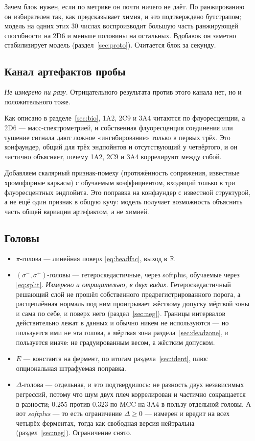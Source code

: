 Зачем блок нужен, если по метрике он почти ничего не даёт. По ранжированию он избирателен так, как
предсказывает химия, и это подтверждено бутстрапом; модель на одних этих 30 числах воспроизводит большую
часть ранжирующей способности на 2D6 и меньше половины на остальных. Вдобавок он заметно стабилизирует
модель (раздел~\ref{sec:proto}). Считается блок за секунду.

\subsection{Канал артефактов пробы}
\label{sec:artifact}

\emph{Не измерено ни разу.} Отрицательного результата против этого канала нет, но и положительного тоже.

Как описано в разделе~\ref{sec:bio}, 1A2, 2C9 и 3A4 читаются по флуоресценции, а 2D6 ---
масс-спектрометрией, и собственная флуоресценция соединения или тушение сигнала дают ложное
«ингибирование» только в первых трёх. Это конфаундер, общий для трёх эндпойнтов и отсутствующий
у четвёртого, и он частично объясняет, почему 1A2, 2C9 и 3A4 коррелируют между собой.

Добавляем скалярный признак-помеху (протяжённость сопряжения, известные хромофорные каркасы) с обучаемым
коэффициентом, входящий только в три флуоресцентных эндпойнта. Это поправка на конфаундер с известной структурой, а не ещё один признак в общую кучу: модель получает
возможность объяснить часть общей вариации артефактом, а не химией.

\subsection{Головы}

\begin{itemize}
\item $\pi$-голова --- линейная поверх \eqref{eq:headfac}, выход в $\mathbb{R}$.
\item $(\sigma^-, \sigma^+)$-головы --- гетероскедастичные, через softplus, обучаемые через
\eqref{eq:split}. \emph{Измерено и отрицательно, в двух видах.} Гетероскедастичный решающий слой не
прошёл собственного предрегистрированного порога, а расщеплённая нормаль под ним проигрывает жёсткому
допуску мёртвой зоны и сама по себе, и поверх него (раздел~\ref{sec:neg}). Границы интервалов
действительно лежат в данных и обычно никем не используются --- но пользуется ими не эта голова, а
мёртвая зона раздела~\ref{sec:deadzone}, и пользуется иначе: не градуированным весом, а жёстким
допуском.
\item $E$ --- константа на фермент, по итогам раздела~\ref{sec:ident}, плюс опциональная штрафуемая поправка.
\item $\Delta$-голова --- отдельная, и это подтвердилось: не разность двух независимых регрессий,
потому что шум двух плеч коррелирован и частично сокращается в разности; 0.255 против 0.323 по MCC на
3A4 в пользу отдельной головы. А вот \emph{softplus} --- то есть ограничение $\Delta \ge 0$ ---
измерен и вредит на всех четырёх ферментах, тогда как свободная версия нейтральна
(раздел~\ref{sec:neg}). Ограничение снято.
\end{itemize}
